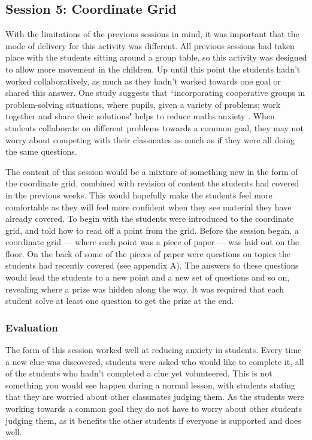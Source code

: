 \documentclass[11pt, a4paper, notitlepage]{article}
\begin{document}
\subsection{Session 5: Coordinate Grid}
With the limitations of the previous sessions in mind, it was important that the mode of delivery for this activity was different. All previous sessions had taken place with the students sitting around a group table, so this activity was designed to allow more movement in the children. Up until this point the students hadn't worked collaboratively, as much as they hadn't worked towards one goal or shared this answer. One study suggests that ``incorporating cooperative groups in problem-solving situations, where pupils, given a  variety of problems; work together and share their solutions" helps to reduce maths anxiety \cite{Alkan:2013}. When students collaborate on different problems towards a common goal, they may not worry about competing with their classmates as much as if they were all doing the same questions.
\par
The content of this session would be a mixture of something new in the form of the coordinate grid, combined with revision of content the students had covered in the previous weeks. This would hopefully make the students feel more comfortable as they will feel more confident when they see material they have already covered. To begin with the students were introduced to the coordinate grid, and told how to read off a point from the grid. Before the session began, a coordinate grid --- where each point was a piece of paper --- was laid out on the floor. On the back of some of the pieces of paper were questions on topics the students had recently covered (see appendix A). The answers to these questions would lead the students to a new point and a new set of questions and so on, revealing where a prize was hidden along the way. It was required that each student solve at least one question to get the prize at the end. 
\subsubsection*{Evaluation} 
The form of this session worked well at reducing anxiety in students. Every time a new clue was discovered, students were asked who would like to complete it, all of the students who hadn't completed a clue yet volunteered. This is not something you would see happen during a normal lesson, with students stating that they are worried about other classmates judging them. As the students were working towards a common goal they do not have to worry about other students judging them, as it benefits the other students if everyone is supported and does well.
\end{document}
